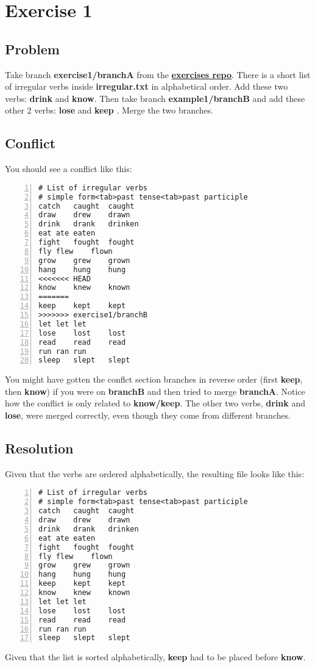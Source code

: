 
\section{Exercise 1}
\label{exercise_01}
\subsection*{Problem}
Take branch {\bf exercise1/branchA } from the \hyperref[exercises_repo]{\bf exercises repo}. There is a short list of
irregular verbs inside {\bf irregular.txt} in alphabetical order. Add these two verbs: {\bf drink} and {\bf know}. Then
take branch {\bf example1/branchB } and add these other 2 verbs: {\bf lose } and {\bf keep }. Merge the two branches.

\subsection*{Conflict}
You should see a conflict like this:
\begin{lstlisting}[style=console_style, numbers=left, caption={\bf Exercise 1} - conflict]
# List of irregular verbs
# simple form<tab>past tense<tab>past participle
catch	caught	caught
draw	drew	drawn
drink	drank	drinken
eat	ate	eaten
fight	fought	fought
fly	flew	flown
grow	grew	grown
hang	hung	hung
<<<<<<< HEAD
know	knew	known
=======
keep	kept	kept
>>>>>>> exercise1/branchB
let	let	let
lose	lost	lost
read	read	read
run	ran	run
sleep	slept	slept
\end{lstlisting}

You might have gotten the conflct section branches in reverse order (first {\bf keep}, then {\bf know}) if you were on {\bf branchB} 
and then tried to merge {\bf branchA}. Notice how the conflict is only related to {\bf know/keep}. The other two verbs,
{\bf drink} and {\bf lose}, were merged correctly, even though they come from different branches.

\subsection*{Resolution}
Given that the verbs are ordered alphabetically, the resulting file looks like this:
\begin{lstlisting}[style=console_style, numbers=left, caption={\bf Exercise 1} - Resolution]
# List of irregular verbs
# simple form<tab>past tense<tab>past participle
catch	caught	caught
draw	drew	drawn
drink	drank	drinken
eat	ate	eaten
fight	fought	fought
fly	flew	flown
grow	grew	grown
hang	hung	hung
keep	kept	kept
know	knew	known
let	let	let
lose	lost	lost
read	read	read
run	ran	run
sleep	slept	slept
\end{lstlisting}
Given that the list is sorted alphabetically, {\bf keep} had to be placed before {\bf know}.


